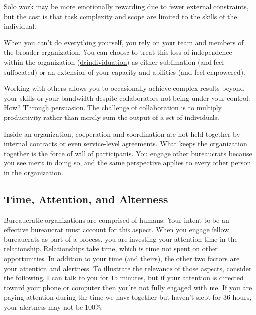 Solo work may be more emotionally rewarding due to fewer external constraints, but the cost is that task complexity and scope are limited to the skills of the individual. 


When you can't do everything yourself, you rely on your team and members of the broader organization. You can choose to treat this loss of independence within the organization (\href{https://en.wikipedia.org/wiki/Deindividuation}{deindividuation}) 
\iftoggle{WPinmargin}{\marginpar{$>$Wikipedia: deindividuation}}{ }
as either sublimation (and feel suffocated) or an extension of your capacity and abilities (and feel empowered).

Working with others allows you to occasionally achieve complex results beyond your skills or your bandwidth despite  collaborators not being under your control. How? Through persuasion. 
The challenge of collaboration is to multiply productivity rather than merely sum the output of a set of individuals. 

Inside an organization, cooperation and coordination are not held together by internal contracts or even \href{https://en.wikipedia.org/wiki/Service-level_agreement}{service-level agreements}. 
%
\iftoggle{WPinmargin}{\marginpar{$>$Wikipedia: Service-level agreements}}{ }
What keeps the organization together is the force of will of participants. 
You engage other bureaucrats because you see merit in doing so, and the same perspective applies to every other person in the organization.

\subsection*{Time, Attention, and Alterness}

Bureaucratic organizations are comprised of humans. Your intent to be an effective bureaucrat must account for this aspect.
When you engage fellow bureaucrats as part of a process, you are investing your \gls{attention-time} in the relationship. Relationships take time, which is time not spent on other opportunities. In addition to your time (and theirs), the other two factors are your attention and alertness. To illustrate the relevance of those aspects, consider the following. I can talk to you for 15 minutes, but if your attention is directed toward your phone or computer then you're not fully engaged with me. If you are paying attention during the time we have together but haven't slept for 36 hours, your alertness may not be 100\%. 


